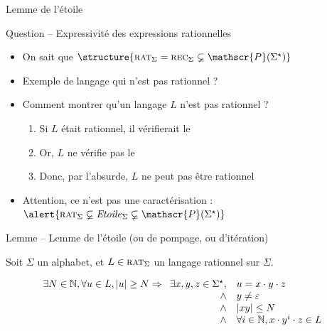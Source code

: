 
\begingroup

\begin{frame}{Lemme de l'étoile}

  \begin{block}{Question -- Expressivité des expressions rationnelles}
    \begin{itemize}
    \item On sait que $\structure{\textsc{rat}_\Sigma = \textsc{rec}_\Sigma \varsubsetneq \mathscr{P}(\Sigma^\star)}$
    \item Exemple de langage qui n'est pas rationnel ? 
    \item Comment montrer qu'un langage $L$ n'est pas rationnel ? 
      \begin{enumerate}
      \item Si $L$ était rationnel, il vérifierait le  
      \item Or, $L$ ne vérifie pas le  
      \item Donc, par l'absurde, $L$ ne peut pas être rationnel
      \end{enumerate}
    \item Attention, ce n'est pas une caractérisation : $\alert{\textsc{rat}_\Sigma \varsubsetneq \mathit{Etoile}_\Sigma \varsubsetneq \mathscr{P}(\Sigma^\star)}$
    \end{itemize}
  \end{block}

  \begin{alertblock}{Lemme -- Lemme de l'étoile (ou de pompage, ou d'itération)}

    Soit $\Sigma$ un alphabet, et $L\in \textsc{rat}_\Sigma$ un langage rationnel sur $\Sigma$.

    $$
    \begin{array}{c}
      \exists N\in \mathbb{N}, \forall u\in L, |u| \ge N \Rightarrow
      \begin{array}[t]{rl}
        \exists x, y, z\in \Sigma^\star, &u = x\cdot y \cdot z \\
        \land& y\neq \varepsilon \\
        \land& |xy| \le N\\
        \land& \forall i \in \mathbb{N}, x\cdot y^i \cdot z \in L
      \end{array}
    \end{array}
    $$

  \end{alertblock}

  
\end{frame}

\endgroup
\endinput
